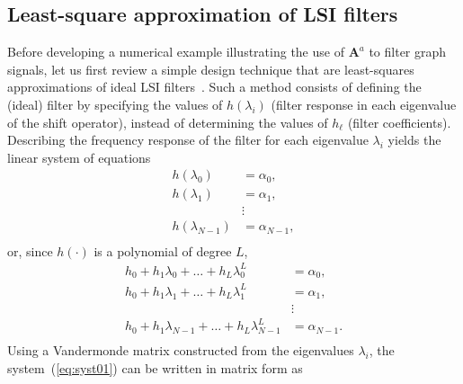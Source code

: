 \subsection{Least-square approximation of LSI filters}\label{subsec:lsi}
Before developing a numerical example illustrating the use of $\mathbf{A}^a$ to filter graph signals, let us first review a simple design technique that are least-squares approximations of ideal LSI filters~\parencite{sandryhaila2014frequency}. Such a method consists of defining the (ideal) filter by specifying the values of $h(\lambda_i)$ (filter response in each eigenvalue of the shift operator), instead of determining the values of $h_{\ell}$ (filter coefficients). Describing the frequency response of the filter for each eigenvalue  $ \lambda_i $ yields the linear system of equations
\begin{equation}
    \label{eq:siseq}
    \begin{aligned}
        h(\lambda_0)     & = \alpha_0,     \\
        h(\lambda_1)     & = \alpha_1,     \\
                         & \vdots          \\
        h(\lambda_{N-1}) & = \alpha_{N-1}, \\
    \end{aligned}
\end{equation}
or, since $ h(\cdot) $ is a polynomial of degree $ L $,
\begin{equation}\label{eq:syst01}
    \begin{aligned}
        h_0 + h_1 \lambda_0 + \dots + h_L \lambda^L_0         & = \alpha_0,     \\
        h_0 + h_1 \lambda_1 + \dots  + h_L \lambda^L_1        & = \alpha_1,     \\
                                                              & \vdots          \\
        h_0 + h_1 \lambda_{N-1} + \dots + h_L \lambda^L_{N-1} & = \alpha_{N-1}. \\
    \end{aligned}
\end{equation}
Using a Vandermonde matrix constructed from the eigenvalues $\lambda_i$, the system~(\ref{eq:syst01}) can be written in matrix form as
